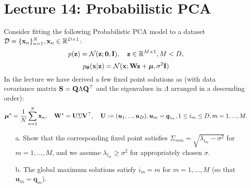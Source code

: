 \section{Lecture 14: Probabilistic PCA}

\begin{question}
\label{q:optimal_prob_pca}
Consider fitting the following Probabilistic PCA model to a dataset $\mathcal{D} = \{ \mathbf{x}_n \}_{n=1}^N, \mathbf{x}_n \in \mathbb{R}^{D \times 1}$:
$$p(\mathbf{z}) = \mathcal{N}(\mathbf{z}; \bm{0}, \mathbf{I}), \quad \mathbf{z} \in \mathbb{R}^{M \times 1}, M < D,$$
$$p_{\bm{\theta}}(\mathbf{x} | \mathbf{z}) = \mathcal{N}(\mathbf{x}; \mathbf W \mathbf{z} + \bm{\mu}, \sigma^2 \mathbf{I})$$
In the lecture we have derived a few fixed point solutions as (with data covariance matrix $\mathbf{S} = \mathbf{Q} \Lambda \mathbf{Q}^\top$ and the eigenvalues in $\Lambda$ arranged in a descending order):
$$\bm{\mu}^* = \frac{1}{N} \sum_{n=1}^N \mathbf{x}_n, \quad \mathbf W^* = \mathbf U \Sigma \mathbf V^{\top}, \quad \mathbf U := (\bm{u}_{1}, ..., \bm{u}_{D}),  \bm{u}_m = \bm{q}_{i_m}, 1 \leq i_m \leq D, m = 1, ..., M.$$
\begin{itemize}
\item[a.] Show that the corresponding fixed point satisfies $\Sigma_{mm} = \sqrt{\lambda_{i_m} - \sigma^2}$ for $m = 1, ..., M$, and we assume $\lambda_{i_m} \geq \sigma^2$ for appropriately chosen $\sigma$.
\item[b.] The global maximum solutions satisfy $i_m = m$ for $m = 1, ..., M$ (so that $\bm{u}_m = \bm{q}_m$).
\end{itemize}
\end{question}

